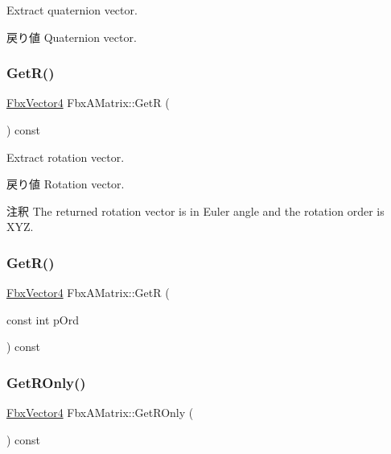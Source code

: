 Extract quaternion vector. \begin{DoxyReturn}{戻り値}
Quaternion vector. 
\end{DoxyReturn}
\mbox{\label{class_fbx_a_matrix_a8c5a30b339c691ecc66b1151f5e8df8b}} 
\subsubsection{\texorpdfstring{Get\+R()}{GetR()}\hspace{0.1cm}{\footnotesize\ttfamily [1/2]}}
{\footnotesize\ttfamily \hyperlink{class_fbx_vector4}{Fbx\+Vector4} Fbx\+A\+Matrix\+::\+GetR (\begin{DoxyParamCaption}{ }\end{DoxyParamCaption}) const}

Extract rotation vector. \begin{DoxyReturn}{戻り値}
Rotation vector. 
\end{DoxyReturn}
\begin{DoxyRemark}{注釈}
The returned rotation vector is in Euler angle and the rotation order is X\+YZ. 
\end{DoxyRemark}
\mbox{\label{class_fbx_a_matrix_ae36e44525e67b5a7076b9e2be733f456}} 
\subsubsection{\texorpdfstring{Get\+R()}{GetR()}\hspace{0.1cm}{\footnotesize\ttfamily [2/2]}}
{\footnotesize\ttfamily \hyperlink{class_fbx_vector4}{Fbx\+Vector4} Fbx\+A\+Matrix\+::\+GetR (\begin{DoxyParamCaption}\item[{const int}]{p\+Ord }\end{DoxyParamCaption}) const}

\mbox{\label{class_fbx_a_matrix_a908a407eab72b8d71cf6c6ab9fa32e4f}} 
\subsubsection{\texorpdfstring{Get\+R\+Only()}{GetROnly()}}
{\footnotesize\ttfamily \hyperlink{class_fbx_vector4}{Fbx\+Vector4} Fbx\+A\+Matrix\+::\+Get\+R\+Only (\begin{DoxyParamCaption}{ }\end{DoxyParamCaption}) const}

